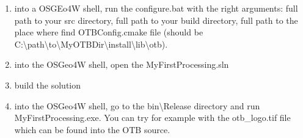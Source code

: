 \begin{enumerate}
\begin{verbatim}
if NOT DEFINED OSGEO4W_ROOT (goto :NoOSGEO4W)
	
set src_dir=%1
set build_dir=%2
set otb_install_dir=%3 
set current_dir=%CD%

cd %build_dir%

cmake %src_dir% ^
      -DCMAKE_INCLUDE_PATH:PATH="%OSGEO4W_ROOT%" ^
      -DCMAKE_LIBRARY_PATH:PATH="%OSGEO4W_ROOT%\lib" ^
      -DOTB_DIR:PATH=%otb_install_dir% ^
      -DCMAKE_CONFIGURATION_TYPES:STRING=Release

cmake --build . --target INSTALL --config Release

cd %current_dir%

goto :END

:Usage
echo You need to provide 3 arguments to the script: 
echo   1. path to the source directory
echo   2. path to the build directory
echo   3. path to the installation directory 
GOTO :END

:NoOSGEO4W
echo You need to run this script from an OSGeo4W shell
GOTO :END

:END
\end{verbatim}
\item into a OSGEo4W shell, run the configure.bat with the right arguments: full path to your src directory, full path to your build directory, full path to the place where find OTBConfig.cmake file (should be C:\textbackslash path\textbackslash to\textbackslash MyOTBDir\textbackslash install\textbackslash lib\textbackslash otb).
\item into the OSGeo4W shell, open the MyFirstProcessing.sln
\item build the solution
\item into the OSGeo4W shell, go to the bin\textbackslash Release directory and run MyFirstProcessing.exe. You can try for example with the otb\_logo.tif file which can be found into the OTB source.
\end{enumerate}

